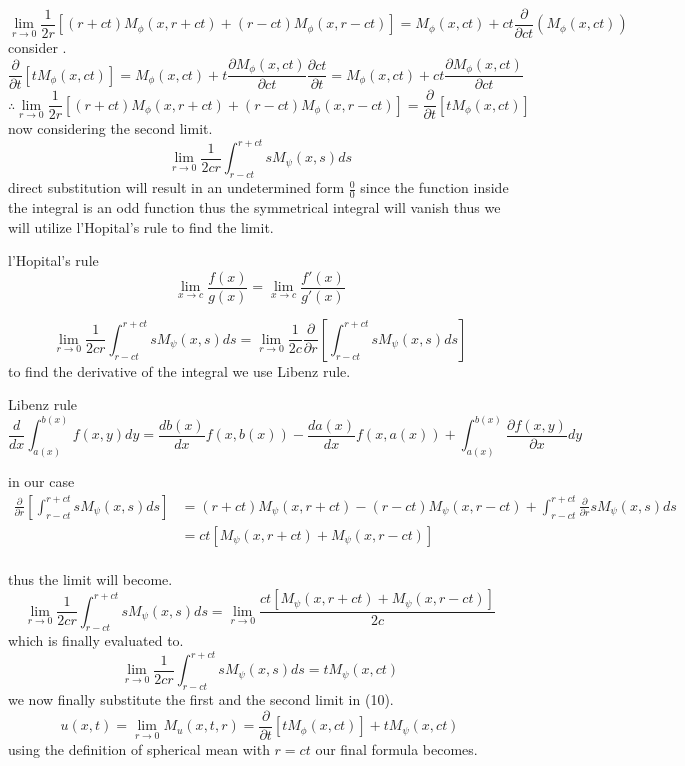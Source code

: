 \documentclass[]{article}
\begin{document}
\[
    \lim_{r\to 0}\frac{1}{2r}\left[(r+ct)M_\phi(x,r+ct)+(r-ct)M_\phi(x,r-ct)\right] = M_\phi(x,ct) + ct\frac{\partial}{\partial ct}(M_\phi(x,ct))    
\]
consider .
\[
    \frac{\partial}{\partial t}[tM_\phi(x,ct)] = M_\phi(x,ct)+t \frac{\partial M_\phi(x,ct)}{\partial ct}\frac{\partial ct}{\partial t} = M_\phi(x,ct)+ct \frac{\partial M_\phi(x,ct)}{\partial ct}    
\]
\[
\therefore \lim_{r\to 0}\frac{1}{2r}\left[(r+ct)M_\phi(x,r+ct)+(r-ct)M_\phi(x,r-ct)\right] = \frac{\partial}{\partial t}[tM_\phi(x,ct)]    
\]
now considering the second limit.
\[
    \lim_{r\to 0}\frac{1}{2cr}\int_{r-ct}^{r+ct} sM_\psi(x,s)ds    
\]
direct substitution will result in an undetermined form $\frac{0}{0}$ since the function inside the integral is an odd function thus the symmetrical integral will vanish thus we will utilize l'Hopital's rule to find the limit.
\begin{enrichment*}{l'Hopital's rule}
    \[
        \lim_{{x \to c}} \frac{{f(x)}}{{g(x)}} = \lim_{{x \to c}} \frac{{f'(x)}}{{g'(x)}}    
    \]
\end{enrichment*}
\[
    \lim_{r\to 0}\frac{1}{2cr}\int_{r-ct}^{r+ct} sM_\psi(x,s)ds = \lim_{r\to 0}\frac{1}{2c}\frac{\partial}{\partial r}\left[\int_{r-ct}^{r+ct} sM_\psi(x,s)ds\right]    
\]
to find the derivative of the integral we use Libenz rule.
\begin{enrichment*}{Libenz rule}
    \[
        \frac{d}{dx}\int_{a(x)}^{b(x)} f(x,y)dy = \frac{db(x)}{dx}f(x,b(x))-\frac{da(x)}{dx}f(x,a(x)) + \int_{a(x)}^{b(x)} \frac{\partial f(x,y)}{\partial x} dy    
    \]
\end{enrichment*}
in our case
\begin{align*}
\frac{\partial}{\partial r}\left[\int_{r-ct}^{r+ct} sM_\psi(x,s)ds\right] &= (r+ct)M_\psi(x,r+ct) - (r-ct)M_\psi(x,r-ct) + \int_{r-ct}^{r+ct} \frac{\partial}{\partial r} sM_\psi(x,s)ds
\\
 &= ct[M_\psi(x,r+ct)+M_\psi(x,r-ct)]
\end{align*}
\\
thus the limit will become.
\[
    \lim_{r\to 0}\frac{1}{2cr}\int_{r-ct}^{r+ct} sM_\psi(x,s)ds = \lim_{r\to 0}\frac{ct[M_\psi(x,r+ct)+M_\psi(x,r-ct)]}{2c}    
\]
which is finally evaluated to.
\[
    \lim_{r\to 0}\frac{1}{2cr}\int_{r-ct}^{r+ct} sM_\psi(x,s)ds = tM_\psi(x,ct)    
\]
we now finally substitute the first and the second limit in (10).
\[
    u(x,t) = \lim_{r\to 0} M_u(x,t,r) = \frac{\partial}{\partial t}[tM_\phi(x,ct)] + tM_\psi(x,ct)    
\]
using the definition of spherical mean with $r=ct$ our final formula becomes.
\end{document}
